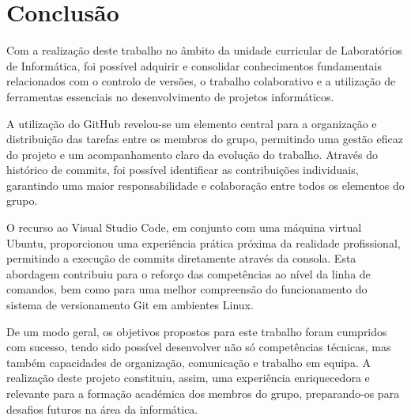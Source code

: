 \chapter{Conclusão}


Com a realização deste trabalho no âmbito da unidade curricular de Laboratórios de Informática, foi possível adquirir e consolidar conhecimentos fundamentais relacionados com o controlo de versões, o trabalho colaborativo e a utilização de ferramentas essenciais no desenvolvimento de projetos informáticos.

\vspace*{0.5cm}

A utilização do GitHub revelou-se um elemento central para a organização e distribuição das tarefas entre os membros do grupo, permitindo uma gestão eficaz do projeto e um acompanhamento claro da evolução do trabalho. Através do histórico de commits, foi possível identificar as contribuições individuais, garantindo uma maior responsabilidade e colaboração entre todos os elementos do grupo.

\vspace*{0.5cm}

O recurso ao Visual Studio Code, em conjunto com uma máquina virtual Ubuntu, proporcionou uma experiência prática próxima da realidade profissional, permitindo a execução de commits diretamente através da consola. Esta abordagem contribuiu para o reforço das competências ao nível da linha de comandos, bem como para uma melhor compreensão do funcionamento do sistema de versionamento Git em ambientes Linux.

\vspace*{0.5cm}

De um modo geral, os objetivos propostos para este trabalho foram cumpridos com sucesso, tendo sido possível desenvolver não só competências técnicas, mas também capacidades de organização, comunicação e trabalho em equipa. A realização deste projeto constituiu, assim, uma experiência enriquecedora e relevante para a formação académica dos membros do grupo, preparando-os para desafios futuros na área da informática.